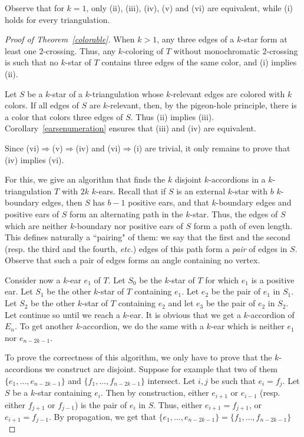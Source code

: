 \documentclass[12pt]{amsart}
\begin{document}
Observe that for $k=1$, only (ii), (iii), (iv), (v) and (vi) are equivalent, while (i) holds for every triangulation.


\begin{proof}[Proof of Theorem~\ref{colorable}]
When $k>1$, any three edges of a $k$-star form at least one $2$-crossing. Thus, any $k$-coloring of $T$ without monochromatic $2$-crossing is such that no $k$-star of $T$ contains three edges of the same color, and (i) implies (ii).

Let $S$ be a $k$-star of a $k$-triangulation whose $k$-relevant edges are colored with $k$ colors. If all edges of $S$ are $k$-relevant, then, by the pigeon-hole principle, there is a color that colors three edges of $S$. Thus (ii) implies (iii).
Corollary~\ref{earsenumeration} ensures that (iii) and (iv) are equivalent.

Since (vi)$\Rightarrow$(v)$\Rightarrow$(iv) and (vi)$\Rightarrow$(i) are trivial, it only remains to prove that (iv) implies (vi). 

For this, we give an algorithm that finds the $k$ disjoint $k$-accordions in a $k$-triangulation $T$ with $2k$ $k$-ears.  Recall that if $S$ is an external $k$-star with $b$ $k$-boundary edges, then $S$ has $b-1$ positive ears, and that $k$-boundary edges and positive ears of $S$ form an alternating path in the $k$-star. Thus, the edges of $S$ which are neither $k$-boundary nor positive ears of $S$ form a path of even length. This defines naturally a ``pairing" of them: we say that the first and the second (resp. the third and the fourth, {\it etc.}) edges of this path form a \emph{pair} of edges in $S$. Observe that such a pair of edges forms an angle containing no vertex.

Consider now a $k$-ear $e_1$ of $T$. Let $S_0$ be the $k$-star of $T$ for which $e_1$ is a positive ear. Let $S_1$ be the other $k$-star of $T$ containing $e_1$. Let $e_2$ be the pair of $e_1$ in $S_1$. Let $S_2$ be the other $k$-star of $T$ containing $e_2$ and let $e_3$ be the pair of $e_2$ in $S_2$. Let continue so until we reach a $k$-ear. It is obvious that we get a $k$-accordion of $E_n$. To get another $k$-accordion, we do the same with a $k$-ear which is neither $e_1$ nor $e_{n-2k-1}$. 

To prove the correctness of this algorithm, we only have to prove that the $k$-accordions we construct are disjoint. Suppose for example that two of them $\{e_1,\ldots,e_{n-2k-1}\}$ and $\{f_1,\ldots,f_{n-2k-1}\}$ intersect. Let $i,j$ be such that $e_i=f_j$. Let $S$ be a $k$-star containing $e_i$. Then by construction, either $e_{i+1}$ or $e_{i-1}$ (resp. either $f_{j+1}$ or $f_{j-1}$) is the pair of $e_i$ in $S$. Thus, either $e_{i+1}=f_{j+1}$, or $e_{i+1}=f_{j-1}$. By propagation, we get that $\{e_1,\ldots,e_{n-2k-1}\}=\{f_1,\ldots,f_{n-2k-1}\}$
\end{proof}
\end{document}
